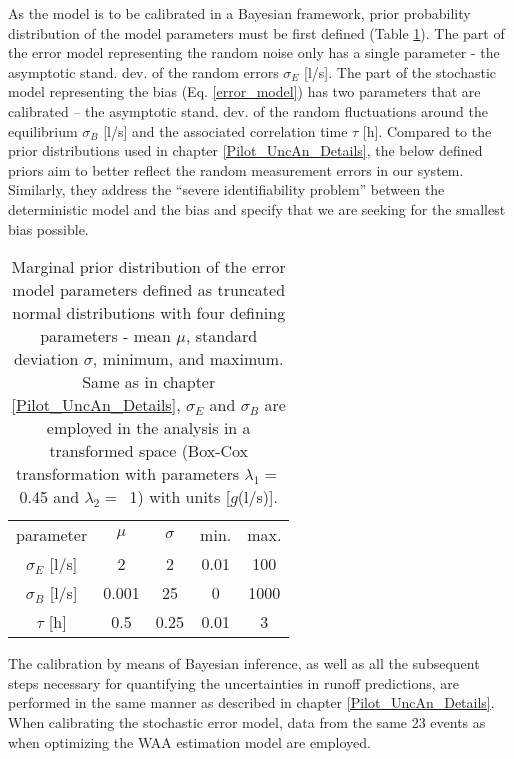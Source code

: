 \documentclass{ctuthesis}\usepackage[]{graphicx}\usepackage[]{color}
\begin{document}
As the model is to be calibrated in a Bayesian framework, prior probability distribution of the model parameters must be first defined (Table \ref{pIII_tab1}). The part of the error model representing the random noise only has a single parameter - the asymptotic stand. dev. of the random errors $\sigma_E$ [l/s]. The part of the stochastic model representing the bias (Eq. \ref{error_model}) has two parameters that are calibrated -- the asymptotic stand. dev. of the random fluctuations around the equilibrium $\sigma_B$ [l/s] and the associated correlation time $\tau$ [h]. 
Compared to the prior distributions used in chapter \ref{Pilot_UncAn_Details}, the below defined priors aim to better reflect the random measurement errors in our system. Similarly, they address the \enquote{severe identifiability problem} between the deterministic model and the bias \citep[][chapter \ref{delGiudTheor}]{reichert2012linking} and specify that we are seeking for the smallest bias possible. 

\begin{table}[h]
\begin{ctucolortab}
\small
\centering
\begin{tabular}{ c |   c  c  c  c }
	parameter &	$\mu$ & 	$\sigma$	& 	min. 	& 	 max.  \\ 
	\Midrule	
        $\sigma_E$ [l/s]	&	2	&	2		&	0.01			        &	100	\\ 
	$\sigma_{B}$ [l/s]	&	0.001	&	25		&	0			        &	1000 \\
	$\tau$ [h]      	&	0.5		&	0.25		&	0.01			&	3
\end{tabular}
\caption{Marginal prior distribution of the error model parameters defined as truncated normal distributions with four defining parameters - mean $\mu$, standard deviation $\sigma$, minimum, and maximum. Same as in chapter \ref{Pilot_UncAn_Details}, $\sigma_E$ and $\sigma_B$ are employed in the analysis in a transformed space (Box-Cox transformation with parameters $\lambda_1 =$ 0.45 and $\lambda_2 =$~1) with units [$g$(l/s)].}
\label{pIII_tab1}
\end{ctucolortab}
\end{table}

The calibration by means of Bayesian inference, as well as all the subsequent steps necessary for quantifying the uncertainties in runoff predictions, are performed in the same manner as described in chapter \ref{Pilot_UncAn_Details}. When calibrating the stochastic error model, data from the same 23 events as when optimizing the WAA estimation model are employed. 
\end{document}
